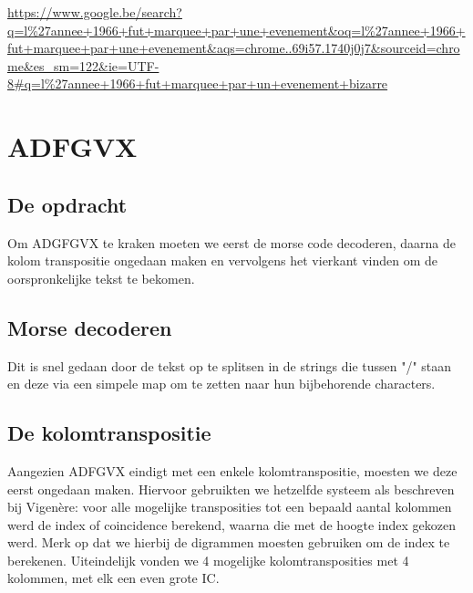 
\urldef{\googleSearch}\url{https://www.google.be/search?q=l%27annee+1966+fut+marquee+par+une+evenement&oq=l%27annee+1966+fut+marquee+par+une+evenement&aqs=chrome..69i57.1740j0j7&sourceid=chrome&es_sm=122&ie=UTF-8#q=l%27annee+1966+fut+marquee+par+un+evenement+bizarre} %

\section{ADFGVX}
\subsection{De opdracht}
Om ADGFGVX te kraken moeten we eerst de morse code decoderen, daarna de kolom transpositie ongedaan maken en vervolgens het vierkant vinden om de oorspronkelijke tekst te bekomen.

\subsection{Morse decoderen}
Dit is snel gedaan door de tekst op te splitsen in de strings die tussen "/" staan en deze via een simpele map om te zetten naar hun bijbehorende characters.

\subsection{De kolomtranspositie}
Aangezien ADFGVX eindigt met een enkele kolomtranspositie, moesten we deze eerst ongedaan maken. Hiervoor gebruikten we hetzelfde systeem als beschreven bij Vigenère: voor alle mogelijke transposities tot een bepaald aantal kolommen werd de index of coincidence berekend, waarna die met de hoogte index gekozen werd. Merk op dat we hierbij de digrammen moesten gebruiken om de index te berekenen. Uiteindelijk vonden we 4 mogelijke kolomtransposities met 4 kolommen, met elk een even grote IC.

